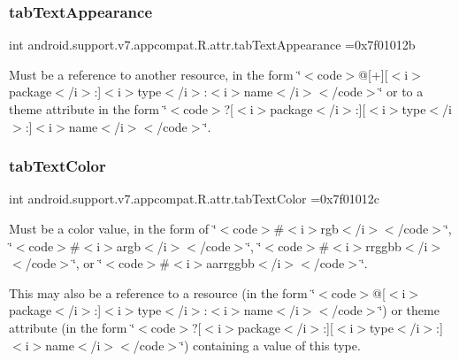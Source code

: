 \subsubsection{\texorpdfstring{tab\+Text\+Appearance}{tabTextAppearance}}
{\footnotesize\ttfamily int android.\+support.\+v7.\+appcompat.\+R.\+attr.\+tab\+Text\+Appearance =0x7f01012b\hspace{0.3cm}{\ttfamily [static]}}

Must be a reference to another resource, in the form \char`\"{}$<$code$>$@\mbox{[}+\mbox{]}\mbox{[}$<$i$>$package$<$/i$>$\+:\mbox{]}$<$i$>$type$<$/i$>$\+:$<$i$>$name$<$/i$>$$<$/code$>$\char`\"{} or to a theme attribute in the form \char`\"{}$<$code$>$?\mbox{[}$<$i$>$package$<$/i$>$\+:\mbox{]}\mbox{[}$<$i$>$type$<$/i$>$\+:\mbox{]}$<$i$>$name$<$/i$>$$<$/code$>$\char`\"{}. \mbox{\label{classandroid_1_1support_1_1v7_1_1appcompat_1_1R_1_1attr_a149b5c83b059d57ad457eeafb2767bef}} 
\subsubsection{\texorpdfstring{tab\+Text\+Color}{tabTextColor}}
{\footnotesize\ttfamily int android.\+support.\+v7.\+appcompat.\+R.\+attr.\+tab\+Text\+Color =0x7f01012c\hspace{0.3cm}{\ttfamily [static]}}

Must be a color value, in the form of \char`\"{}$<$code$>$\#$<$i$>$rgb$<$/i$>$$<$/code$>$\char`\"{}, \char`\"{}$<$code$>$\#$<$i$>$argb$<$/i$>$$<$/code$>$\char`\"{}, \char`\"{}$<$code$>$\#$<$i$>$rrggbb$<$/i$>$$<$/code$>$\char`\"{}, or \char`\"{}$<$code$>$\#$<$i$>$aarrggbb$<$/i$>$$<$/code$>$\char`\"{}. 

This may also be a reference to a resource (in the form \char`\"{}$<$code$>$@\mbox{[}$<$i$>$package$<$/i$>$\+:\mbox{]}$<$i$>$type$<$/i$>$\+:$<$i$>$name$<$/i$>$$<$/code$>$\char`\"{}) or theme attribute (in the form \char`\"{}$<$code$>$?\mbox{[}$<$i$>$package$<$/i$>$\+:\mbox{]}\mbox{[}$<$i$>$type$<$/i$>$\+:\mbox{]}$<$i$>$name$<$/i$>$$<$/code$>$\char`\"{}) containing a value of this type. \mbox{\label{classandroid_1_1support_1_1v7_1_1appcompat_1_1R_1_1attr_a3bd1f2ce4b725772d80858408dc8d52c}} 
